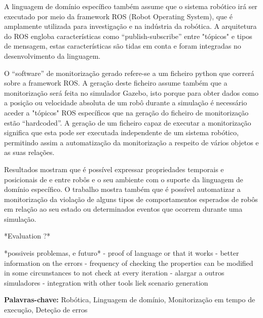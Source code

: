 A linguagem de domínio específico também assume que o sistema robótico irá ser executado por meio da framework ROS (Robot Operating System), que é amplamente utilizada para investigação e na indústria da robótica. A arquitetura do ROS engloba características como “publish-subscribe” entre "tópicos" e tipos de mensagem, estas características são tidas em conta e foram integradas no desenvolvimento da linguagem.

O “software” de monitorização gerado refere-se a um ficheiro python que correrá sobre a framework ROS. A geração deste ficheiro assume também que a monitorização será feita no simulador Gazebo, isto porque para obter dados como a posição ou velocidade absoluta de um robô durante a simulação é necessário aceder a "tópicos" ROS específicos que na geração do ficheiro de monitorização estão “hardcoded”. A geração de um ficheiro capaz de executar a monitorização significa que esta pode ser executada independente de um sistema robótico, permitindo assim a automatização da monitorização a respeito de vários objetos e as suas relações.

Resultados mostram que é possível expressar propriedades temporais e posicionais de e entre robôs e o seu ambiente com o suporte da linguagem de domínio específico. O trabalho mostra também que é possível automatizar a monitorização da violação de alguns tipos de comportamentos esperados de robôs em relação ao seu estado ou determinados eventos que ocorrem durante uma simulação.

*Evaluation ?*

*possiveis problemas, e futuro* - proof of language or that it works - better information on the errors - frequency of checking the properties can be modified in some circunstances to not check at every iteration - alargar a outros simuladores - integration with other tools liek scenario generation


\vfill

\begin{flushleft}
\textbf{Palavras-chave:}
Robótica, Linguagem de domínio, Monitorização em tempo de execução, Deteção de erros
\end{flushleft}

